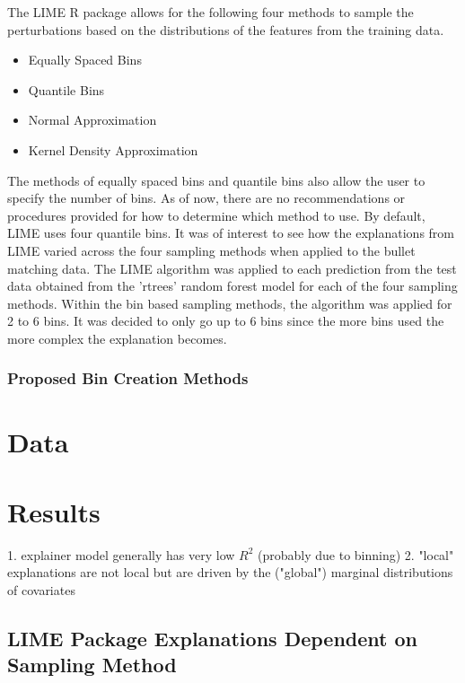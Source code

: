 \documentclass[AMS,STIX2COL]{WileyNJD-v2}
\begin{document}
The LIME R package allows for the following four methods to sample the perturbations based on the distributions of the features from the training data.

\begin{itemize}
\item Equally Spaced Bins
\item Quantile Bins
\item Normal Approximation
\item Kernel Density Approximation
\end{itemize}

The methods of equally spaced bins and quantile bins also allow the user to specify the number of bins. As of now, there are no recommendations or procedures provided for how to determine which method to use. By default, LIME uses four quantile bins. It was of interest to see how the explanations from LIME varied across the four sampling methods when applied to the bullet matching data. The LIME algorithm was applied to each prediction from the test data obtained from the 'rtrees' random forest model for each of the four sampling methods. Within the bin based sampling methods, the algorithm was applied for 2 to 6 bins. It was decided to only go up to 6 bins since the more bins used the more complex the explanation becomes.

\subsubsection{Proposed Bin Creation Methods}

\section{Data}

\section{Results}

1. explainer model generally has very low $R^2$ (probably due to binning)
2. "local" explanations are not local but are driven by the ("global") marginal distributions of covariates

\subsection{LIME Package Explanations Dependent on Sampling Method}
\end{document}

